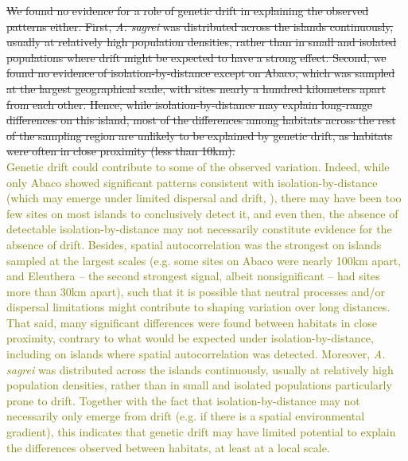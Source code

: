 \sout{We found no evidence for a role of genetic drift in explaining the observed patterns either. First, \textit{A. sagrei} was distributed across the islands continuously, usually at relatively high population densities, rather than in small and isolated populations where drift might be expected to have a strong effect. Second, we found no evidence of isolation-by-distance except on Abaco, which was sampled at the largest geographical scale, with sites nearly a hundred kilometers apart from each other. Hence, while isolation-by-distance may explain long-range differences on this island, most of the differences among habitats across the rest of the sampling region are unlikely to be explained by genetic drift, as habitats were often in close proximity (less than 10km).}\\

\textcolor{olive}{Genetic drift could contribute to some of the observed variation. Indeed, while only Abaco showed significant patterns consistent with isolation-by-distance (which may emerge under limited dispersal and drift, \citealt{Wright1943, Kimura1964, Slatkin1987}), there may have been too few sites on most islands to conclusively detect it, and even then, the absence of detectable isolation-by-distance may not necessarily constitute evidence for the absence of drift. Besides, spatial autocorrelation was the strongest on islands sampled at the largest scales (e.g. some sites on Abaco were nearly 100km apart, and Eleuthera -- the second strongest signal, albeit nonsignificant -- had sites more than 30km apart), such that it is possible that neutral processes and/or dispersal limitations might contribute to shaping variation over long distances. That said, many significant differences were found between habitats in close proximity, contrary to what would be expected under isolation-by-distance, including on islands where spatial autocorrelation was detected. Moreover, \textit{A. sagrei} was distributed across the islands continuously, usually at relatively high population densities, rather than in small and isolated populations particularly prone to drift. Together with the fact that isolation-by-distance may not necessarily only emerge from drift (e.g. if there is a spatial environmental gradient), this indicates that genetic drift may have limited potential to explain the differences observed between habitats, at least at a local scale.}\\

